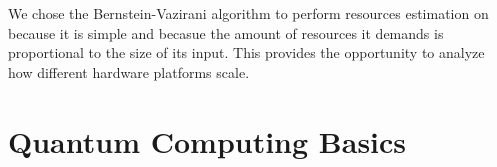 
We chose the Bernstein-Vazirani algorithm to perform resources estimation on because it is simple and becasue the amount of resources it demands is proportional to the size of its input. This provides the opportunity to analyze how different hardware platforms scale.

\section{Quantum Computing Basics}

